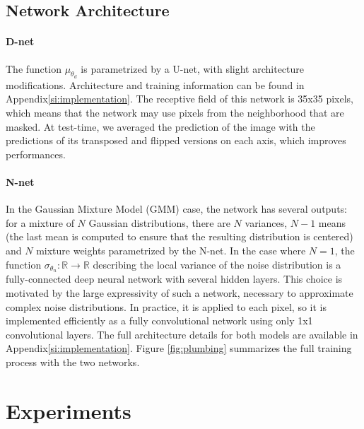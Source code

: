 \documentclass[lettersize,journal]{IEEEtran}
\begin{document}
\subsection{Network Architecture}
\label{sec:architectures}


\paragraph{D-net}
The function $\mu_{\theta_d}$ is parametrized by a U-net, with slight architecture modifications.
Architecture and training information can be found in Appendix\ref{si:implementation}.
The receptive field of this network is 35x35 pixels, which means that the network may use pixels from the neighborhood that are masked.
At test-time, we averaged the prediction of the image with the predictions of its transposed and flipped versions on each axis, which improves performances.

\paragraph{N-net}
In the Gaussian Mixture Model (GMM) case, the network has several outputs: for a mixture of $N$ Gaussian distributions, there are $N$ variances, $N-1$ means (the last mean is computed to ensure that the resulting distribution is centered) and $N$ mixture weights parametrized by the N-net.
In the case where $N=1$, the function $\sigma_{\theta_n}: \mathbb{R} \to \mathbb{R}$ describing the local variance of the noise distribution is a fully-connected deep neural network with several hidden layers. This choice is motivated by the large expressivity of such a network, necessary to approximate complex noise distributions. In practice, it is applied to each pixel, so it is implemented efficiently as a fully convolutional network using only 1x1 convolutional layers. The full architecture details for both models are available in Appendix\ref{si:implementation}.
Figure \ref{fig:plumbing} summarizes the full training process with the two networks.


\section{Experiments}
\label{sec:experiments}
\end{document}
